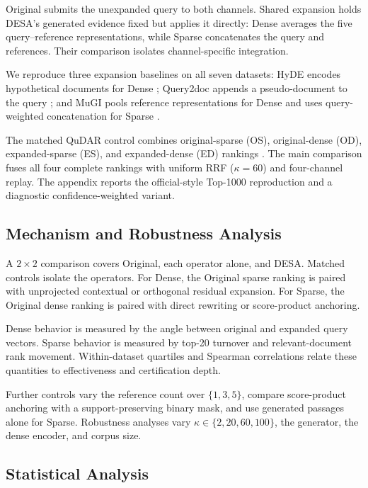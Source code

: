\label{comparison-methods}

Original submits the unexpanded query to both channels. Shared expansion holds DESA's generated evidence fixed but applies it directly: Dense averages the five query--reference representations, while Sparse concatenates the query and references. Their comparison isolates channel-specific integration.

We reproduce three expansion baselines on all seven datasets: HyDE encodes hypothetical documents for Dense \citep{gao-etal-2023-precise}; Query2doc appends a pseudo-document to the query \citep{wang-etal-2023-query2doc}; and MuGI pools reference representations for Dense and uses query-weighted concatenation for Sparse \citep{zhang-etal-2024-exploring-best}.

The matched QuDAR control combines original-sparse (OS), original-dense (OD), expanded-sparse (ES), and expanded-dense (ED) rankings \citep{kim-etal-2026-qudar}. The main comparison fuses all four complete rankings with uniform RRF (\(\kappa=60\)) and four-channel replay. The appendix reports the official-style Top-1000 reproduction and a diagnostic confidence-weighted variant.

\subsection{Mechanism and Robustness Analysis}

\label{mechanism-and-robustness-analysis}

A \(2\times2\) comparison covers Original, each operator alone, and DESA. Matched controls isolate the operators. For Dense, the Original sparse ranking is paired with unprojected contextual or orthogonal residual expansion. For Sparse, the Original dense ranking is paired with direct rewriting or score-product anchoring.

Dense behavior is measured by the angle between original and expanded query vectors. Sparse behavior is measured by top-20 turnover and relevant-document rank movement. Within-dataset quartiles and Spearman correlations relate these quantities to effectiveness and certification depth.

Further controls vary the reference count over \(\{1,3,5\}\), compare score-product anchoring with a support-preserving binary mask, and use generated passages alone for Sparse. Robustness analyses vary \(\kappa\in\{2,20,60,100\}\), the generator, the dense encoder, and corpus size.

\subsection{Statistical Analysis}

